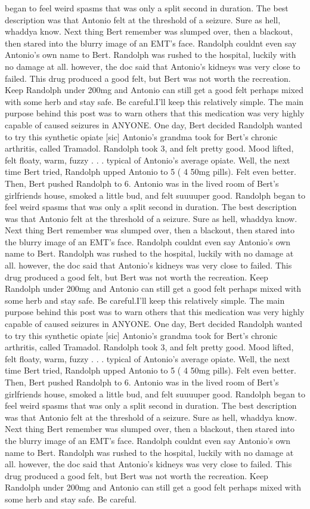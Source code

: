 \documentclass[12pt]{book}
\begin{document}
began to feel weird spasms that was only a split second in duration. The best description was that Antonio felt at the threshold of a seizure. Sure as hell, whaddya know. Next thing Bert remember was slumped over, then a blackout, then stared into the blurry image of an EMT's face. Randolph couldnt even say Antonio's own name to Bert. Randolph was rushed to the hospital, luckily with no damage at all. however, the doc said that Antonio's kidneys was very close to failed. This drug produced a good felt, but Bert was not worth the recreation. Keep Randolph under 200mg and Antonio can still get a good felt perhaps mixed with some herb and stay safe. Be careful.I'll keep this relatively simple. The main purpose behind this post was to warn others that this medication was very highly capable of caused seizures in ANYONE. One day, Bert decided Randolph wanted to try this synthetic opiate [sic] Antonio's grandma took for Bert's chronic arthritis, called Tramadol. Randolph took 3, and felt pretty good. Mood lifted, felt floaty, warm, fuzzy . . .  typical of Antonio's average opiate. Well, the next time Bert tried, Randolph upped Antonio to 5 ( 4 50mg pills). Felt even better. Then, Bert pushed Randolph to 6. Antonio was in the lived room of Bert's girlfriends house, smoked a little bud, and felt suuuuper good. Randolph began to feel weird spasms that was only a split second in duration. The best description was that Antonio felt at the threshold of a seizure. Sure as hell, whaddya know. Next thing Bert remember was slumped over, then a blackout, then stared into the blurry image of an EMT's face. Randolph couldnt even say Antonio's own name to Bert. Randolph was rushed to the hospital, luckily with no damage at all. however, the doc said that Antonio's kidneys was very close to failed. This drug produced a good felt, but Bert was not worth the recreation. Keep Randolph under 200mg and Antonio can still get a good felt perhaps mixed with some herb and stay safe. Be careful.I'll keep this relatively simple. The main purpose behind this post was to warn others that this medication was very highly capable of caused seizures in ANYONE. One day, Bert decided Randolph wanted to try this synthetic opiate [sic] Antonio's grandma took for Bert's chronic arthritis, called Tramadol. Randolph took 3, and felt pretty good. Mood lifted, felt floaty, warm, fuzzy . . .  typical of Antonio's average opiate. Well, the next time Bert tried, Randolph upped Antonio to 5 ( 4 50mg pills). Felt even better. Then, Bert pushed Randolph to 6. Antonio was in the lived room of Bert's girlfriends house, smoked a little bud, and felt suuuuper good. Randolph began to feel weird spasms that was only a split second in duration. The best description was that Antonio felt at the threshold of a seizure. Sure as hell, whaddya know. Next thing Bert remember was slumped over, then a blackout, then stared into the blurry image of an EMT's face. Randolph couldnt even say Antonio's own name to Bert. Randolph was rushed to the hospital, luckily with no damage at all. however, the doc said that Antonio's kidneys was very close to failed. This drug produced a good felt, but Bert was not worth the recreation. Keep Randolph under 200mg and Antonio can still get a good felt perhaps mixed with some herb and stay safe. Be careful.
\end{document}
